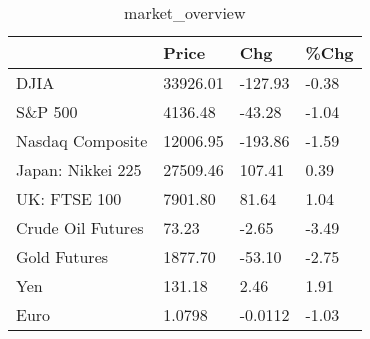 \documentclass{article}%
\begin{document}
%


\begin{table}[htbp]%
\caption{market\_overview}%
\centering%
\begin{adjustbox}{width=1\textwidth}%
\begin{tabular}{llll}
\toprule
                  &    Price &     Chg &  \%Chg \\
\midrule
             DJIA & 33926.01 & -127.93 & -0.38 \\
          S\&P 500 &  4136.48 &  -43.28 & -1.04 \\
 Nasdaq Composite & 12006.95 & -193.86 & -1.59 \\
Japan: Nikkei 225 & 27509.46 &  107.41 &  0.39 \\
     UK: FTSE 100 &  7901.80 &   81.64 &  1.04 \\
Crude Oil Futures &    73.23 &   -2.65 & -3.49 \\
     Gold Futures &  1877.70 &  -53.10 & -2.75 \\
              Yen &   131.18 &    2.46 &  1.91 \\
             Euro &   1.0798 & -0.0112 & -1.03 \\
\bottomrule
\end{tabular}
%
\end{adjustbox}%
\end{table}

%
\end{document}
